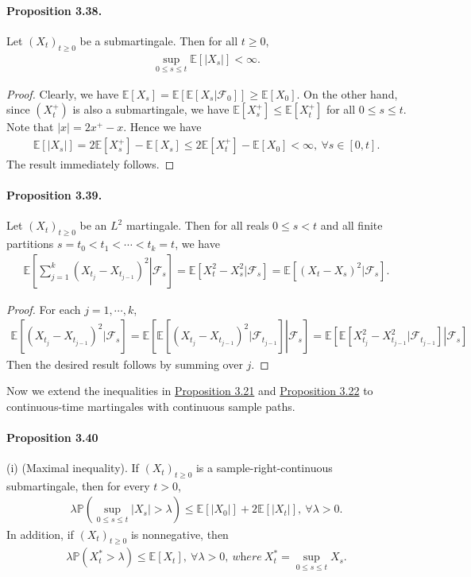 \documentclass{article}
\numberwithin{equation}{section}
\newcommand{\E}{\mathbb{E}}
\renewcommand{\P}{\mathbb{P}}
\theoremstyle{plain}
\theoremstyle{definition}
\begin{document}
\paragraph{Proposition 3.38.\label{prop:3.38}} Let $(X_t)_{t\geq 0}$ be a submartingale. Then for all $t\geq 0$,
\begin{align*}
	\sup_{0\leq s\leq t}\E[\vert X_s\vert] < \infty.
\end{align*}
\begin{proof}
Clearly, we have $\E[X_s]=\E[\E[X_s|\mathscr{F}_0]]\geq\E[X_0]$. On the other hand, since $(X_t^+)$ is also a submartingale, we have $\E[X_s^+]\leq\E[X_t^+]$ for all $0\leq s\leq t$. Note that $\vert x\vert=2x^+-x$. Hence we have
\begin{align*}
	\E[\vert X_s\vert] = 2\E[X_s^+]-\E[X_s] \leq 2\E[X_t^+] - \E[X_0]<\infty,\ \forall s\in[0,t].
\end{align*}
The result immediately follows.
\end{proof}

\paragraph{Proposition 3.39.\label{prop:3.39}} Let $(X_t)_{t\geq 0}$ be an $L^2$ martingale. Then for all reals $0\leq s < t$ and all finite partitions $s=t_0<t_1<\cdots<t_k=t$, we have
\begin{align*}
	\E\left[\left.\sum_{j=1}^k(X_{t_j}-X_{t_{j-1}})^2\right|\mathscr{F}_s\right] = \E\left[X_t^2-X_s^2|\mathscr{F}_s\right] = \E\left[(X_t-X_s)^2|\mathscr{F}_s\right].
\end{align*}
\begin{proof}
For each $j=1,\cdots,k$,
\begin{align*}
	\E\left[(X_{t_j}-X_{t_{j-1}})^2|\mathscr{F}_s\right]=\E\left[\left.\E\left[(X_{t_j}-X_{t_{j-1}})^2|\mathscr{F}_{t_{j-1}}\right]\right|\mathscr{F}_s\right]=\E\left[\left.\E\left[X_{t_j}^2-X_{t_{j-1}}^2|\mathscr{F}_{t_{j-1}}\right]\right|\mathscr{F}_s\right]
\end{align*}
Then the desired result follows by summing over $j$.
\end{proof}

Now we extend the inequalities in \hyperref[prop:3.21]{Proposition 3.21} and \hyperref[prop:3.22]{Proposition 3.22} to continuous-time martingales with continuous sample paths.

\paragraph{Proposition 3.40\label{prop:3.40}} (i) (Maximal inequality). If $(X_t)_{t\geq 0}$ is a sample-right-continuous submartingale, then for every $t>0$,
\begin{align*}
	\lambda\P\left(\sup_{0\leq s\leq t}\vert X_s\vert>\lambda\right)\leq \E[\vert X_0\vert] + 2\E[\vert X_t\vert],\ \forall \lambda>0.
\end{align*}
In addition, if $(X_t)_{t\geq 0}$ is nonnegative, then
\begin{align*}
	\lambda\P\left(X_t^*>\lambda\right)\leq\E[X_t],\ \forall \lambda>0,\ \textit{where}\ X_t^*=\sup_{0\leq s\leq t} X_s.
\end{align*}
\end{document}
